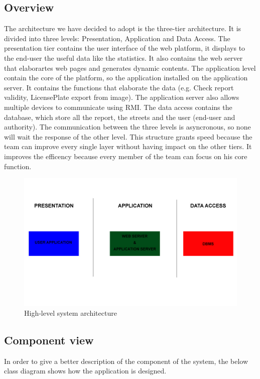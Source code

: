 \subsection{Overview}
The architecture we have decided to adopt is the three-tier architecture.
It is divided into three levels: Presentation, Application and Data Access.
The presentation tier contains the user interface of the web platform, it displays to the end-user the useful data like the statistics.
It also contains the web server that elaborartes web pages and generates dynamic contents.
The application level contain the core of the platform, so the application installed on the application server.
It contains the functions that elaborate the data (e.g. Check report validity, LicensePlate export from image).
The application server also allows multiple devices to communicate using RMI.
The data access contains the database, which store all the report, the streets and the user (end-user and authority).
The communication between the three levels is asyncronous, so none will wait the response of the other level.
This structure grants speed because the team can improve every single layer without having impact on the other tiers.
It improves the efficency because every member of the team can focus on his core function.

\begin{figure}
	
	\includegraphics[width=0.95\linewidth, height=0.20\textheight]{../DD/Images/architecture}
	\caption{High­‐level
		system
		architecture}
	\label{High­‐level
		system
		architecture}
\end{figure}

\newpage

\subsection{Component view}
In order to give a better description of the component of the system, the below class diagram shows how the application is designed.

